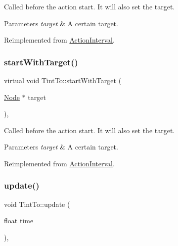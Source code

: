Called before the action start. It will also set the target.


\begin{DoxyParams}{Parameters}
{\em target} & A certain target. \\
\hline
\end{DoxyParams}


Reimplemented from \hyperlink{classActionInterval_ad3d91186b2c3108488ddbbdbbd982484}{Action\+Interval}.

\mbox{\label{classTintTo_ad6a3f4c53c94b2af92d5a4b6dfd3181d}} 
\subsubsection{\texorpdfstring{start\+With\+Target()}{startWithTarget()}\hspace{0.1cm}{\footnotesize\ttfamily [2/2]}}
{\footnotesize\ttfamily virtual void Tint\+To\+::start\+With\+Target (\begin{DoxyParamCaption}\item[{\hyperlink{classNode}{Node} $\ast$}]{target }\end{DoxyParamCaption})\hspace{0.3cm}{\ttfamily [override]}, {\ttfamily [virtual]}}

Called before the action start. It will also set the target.


\begin{DoxyParams}{Parameters}
{\em target} & A certain target. \\
\hline
\end{DoxyParams}


Reimplemented from \hyperlink{classActionInterval_ad3d91186b2c3108488ddbbdbbd982484}{Action\+Interval}.

\mbox{\label{classTintTo_a09ec73412f7343b89a0a86ca560a1383}} 
\subsubsection{\texorpdfstring{update()}{update()}\hspace{0.1cm}{\footnotesize\ttfamily [1/2]}}
{\footnotesize\ttfamily void Tint\+To\+::update (\begin{DoxyParamCaption}\item[{float}]{time }\end{DoxyParamCaption})\hspace{0.3cm}{\ttfamily [override]}, {\ttfamily [virtual]}}


